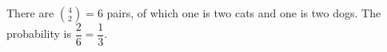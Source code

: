 There are $\binom42=6$ pairs, of which one is two cats and one is two dogs. The probability is $\dfrac{2}{6}=\boxed{\dfrac{1}{3}}$.
